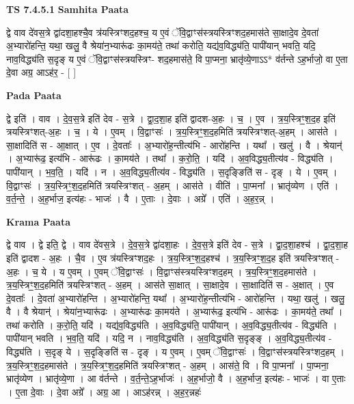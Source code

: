 \documentclass[17pt]{extarticle}
\begin{document}
\textbf{TS 7.4.5.1 } \newline
\textbf{Samhita Paata} \newline

द्वे वाव दे॑वस॒त्रे द्वा॑दशा॒हश्चै॒व त्र॑यस्त्रिꣳशद॒हश्च॒ य ए॒वं ॅवि॒द्वाꣳस॑स्त्रयस्त्रिꣳशद॒हमास॑ते सा॒क्षादे॒व दे॒वता॑ अ॒भ्यारो॑हन्ति॒ यथा॒ खलु॒ वै श्रेया॑न॒भ्यारू॑ढः का॒मय॑ते॒ तथा॑ करोति॒ यद्य॑व॒विद्ध्य॑ति॒ पापी॑यान् भवति॒ यदि॒ नाव॒विद्ध्य॑ति स॒दृङ् य ए॒वं ॅवि॒द्वाꣳस॑स्त्रयस्त्रिꣳ- शद॒हमास॑ते॒ वि पा॒प्मना॒ भ्रातृ॑व्ये॒णाऽऽ* व॑र्तन्ते ऽह॒र्भाजो॒ वा ए॒ता दे॒वा अग्र॒ आऽह॑र॒ - [  ] \newline

\textbf{Pada Paata} \newline

द्वे इति॑ । वाव । दे॒व॒स॒त्रे इति॑ देव - स॒त्रे । द्वा॒द॒शा॒ह इति॑ द्वादश-अ॒हः । च॒ । ए॒व । त्र॒य॒स्त्रिꣳ॒॒श॒द॒ह इति॑ त्रयस्त्रिꣳशत्-अ॒हः । च॒ । ये । ए॒वम् । वि॒द्वाꣳसः॑ । त्र॒य॒स्त्रिꣳ॒॒श॒द॒हमिति॑ त्रयस्त्रिꣳशत्-अ॒हम् । आस॑ते । सा॒क्षादिति॑ स - आ॒क्षात् । ए॒व । दे॒वताः᳚ । अ॒भ्यारो॑ह॒न्तीत्य॑भि - आरो॑हन्ति । यथा᳚ । खलु॑ । वै । श्रेयान्॑ । अ॒भ्यारू॑ढ॒ इत्य॑भि - आरू॑ढः । का॒मय॑ते । तथा᳚ । क॒रो॒ति॒ । यदि॑ । अ॒व॒विद्ध्य॒तीत्य॑व - विद्ध्य॑ति । पापी॑यान् । भ॒व॒ति॒ । यदि॑ । न । अ॒व॒विद्ध्य॒तीत्य॑व - विद्ध्य॑ति । स॒दृङ्ङिति॑ स - दृङ् । ये । ए॒वम् । वि॒द्वाꣳसः॑ । त्र॒य॒स्त्रिꣳ॒॒श॒द॒हमिति॑ त्रयस्त्रिꣳशत् - अ॒हम् । आस॑ते । वीति॑ । पा॒प्मना᳚ । भ्रातृ॑व्येण । एति॑ । व॒र्त॒न्ते॒ । अ॒ह॒र्भाज॒ इत्य॑हः - भाजः॑ । वै । ए॒ताः । दे॒वाः । अग्रे᳚ । एति॑ । अ॒ह॒र॒न्न् ।  \newline


\textbf{Krama Paata} \newline

द्वे वाव । द्वे इति॒ द्वे । वाव दे॑वस॒त्रे । दे॒व॒स॒त्रे द्वा॑दशा॒हः । दे॒व॒स॒त्रे इति॑ देव - स॒त्रे । द्वा॒द॒शा॒हश्च॑ । द्वा॒द॒शा॒ह इति॑ द्वादश - अ॒हः । चै॒व । ए॒व त्र॑यस्त्रिꣳशद॒हः । त्र॒य॒स्त्रिꣳ॒॒श॒द॒हश्च॑ । त्र॒य॒स्त्रिꣳ॒॒श॒द॒ह इति॑ त्रयस्त्रिꣳशत् - अ॒हः । च॒ ये । य ए॒वम् । ए॒वम् ॅवि॒द्वाꣳसः॑ । वि॒द्वाꣳस॑स्त्रयस्त्रिꣳशद॒हम् । त्र॒य॒स्त्रिꣳ॒॒श॒द॒हमास॑ते । त्र॒य॒स्त्रिꣳ॒॒श॒द॒हमिति॑ त्रयस्त्रिꣳशत् - अ॒हम् । आस॑ते सा॒क्षात् । सा॒क्षादे॒व । सा॒क्षादिति॑ स - अ॒क्षात् । ए॒व दे॒वताः᳚ । दे॒वता॑ अ॒भ्यारो॑हन्ति । अ॒भ्यारो॑हन्ति॒ यथा᳚ । अ॒भ्यारो॑ह॒न्तीत्य॑भि - आरो॑हन्ति । यथा॒ खलु॑ । खलु॒ वै । वै श्रेयान्॑ । श्रेया॑न॒भ्यारू॑ढः । अ॒भ्यारू॑ढः का॒मय॑ते । अ॒भ्यारू॑ढ॒ इत्य॑भि - आरू॑ढः । का॒मय॑ते॒ तथा᳚ । तथा॑ करोति । क॒रो॒ति॒ यदि॑ । यद्य॑व॒विद्ध्य॑ति । अ॒व॒विद्ध्य॑ति॒ पापी॑यान् । अ॒व॒विद्ध्य॒तीत्य॑व - विद्ध्य॑ति । पापी॑यान् भवति । भ॒व॒ति॒ यदि॑ । यदि॒ न । नाव॒विद्ध्य॑ति । अ॒व॒विद्ध्य॑ति स॒दृङ्‍ङ् । अ॒व॒विद्ध्य॒तीत्य॑व - विद्ध्य॑ति । स॒दृङ्‍ ये । स॒दृङ्ङिति॑ स - दृङ्‍ । य ए॒वम् । ए॒वम् ॅवि॒द्वाꣳसः॑ । वि॒द्वाꣳस॑स्त्रयस्त्रिꣳशद॒हम् । त्र॒य॒स्त्रिꣳ॒॒श॒द॒हमास॑ते । त्र॒य॒स्त्रिꣳ॒॒श॒द॒हमिति॑ त्रयस्त्रिꣳशत् - अ॒हम् । आस॑ते॒ वि । वि पा॒प्मना᳚ । पा॒प्मना॒ भ्रातृ॑व्येण । भ्रातृ॑व्ये॒णा । आ व॑र्तन्ते । व॒र्त॒न्ते॒ऽह॒र्भाजः॑ । अ॒ह॒र्भाजो॒ वै । अ॒ह॒र्भाज॒ इत्य॑हः - भाजः॑ । वा ए॒ताः । ए॒ता दे॒वाः । दे॒वा अग्रे᳚ । अग्र॒ आ । आऽह॑रन्न् । अ॒ह॒र॒न्नहः॑ \newline
\end{document}
